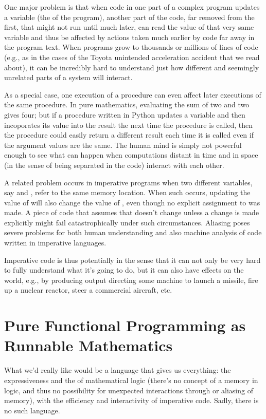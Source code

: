 \documentclass[letterpaper,10pt,english]{sphinxmanual}
\begin{document}
One major problem is that when code in one part of a complex program
updates a variable (the  of the program), another part of the
code, far removed from the first, that might not run until much later,
can read the value of that very same variable and thus be affected by
actions taken much earlier by code far away in the program text. When
programs grow to thousands or millions of lines of code (e.g., as in
the cases of the Toyota unintended acceleration accident that we read
about), it can be incredibly hard to understand just how different and
seemingly unrelated parts of a system will interact.

As a special case, one execution of a procedure can even affect later
executions of the same procedure. In pure mathematics, evaluating the
sum of two and two  gives four; but if a procedure written in
Python updates a  variable and then incoporates its value into
the result the next time the procedure is called, then the procedure
could easily return a different result each time it is called even if
the argument values are the same. The human mind is simply not powerful
enough to see what can happen when computations distant in time and in
space (in the sense of being separated in the code) interact with each
other.

A related problem occurs in imperative programs when two different
variables, say  and , refer to the same memory location. When
such  occurs, updating the value of  will also change the
value of , even though no explicit assignment to  was made. A
piece of code that assumes that  doesn’t change unless a change is
made explicitly might fail catastrophically under such circumstances.
Aliasing poses severe problems for both human understanding and also
machine analysis of code written in imperative languages.

Imperative code is thus potentially  in the sense that it can
not only be very hard to fully understand what it’s going to do, but
it can also have effects on the world, e.g., by producing output
directing some machine to launch a missile, fire up a nuclear reactor,
steer a commercial aircraft, etc.


\chapter{Pure Functional Programming as Runnable Mathematics}
\label{\detokenize{04-runnable-math:pure-functional-programming-as-runnable-mathematics}}\label{\detokenize{04-runnable-math::doc}}
What we’d really like would be a language that gives us everything:
the expressiveness and the  of mathematical logic (there’s no
concept of a memory in logic, and thus no possibility for unexpected
interactions through or aliasing of memory), with the efficiency and
interactivity of imperative code. Sadly, there is no such language.
\end{document}
